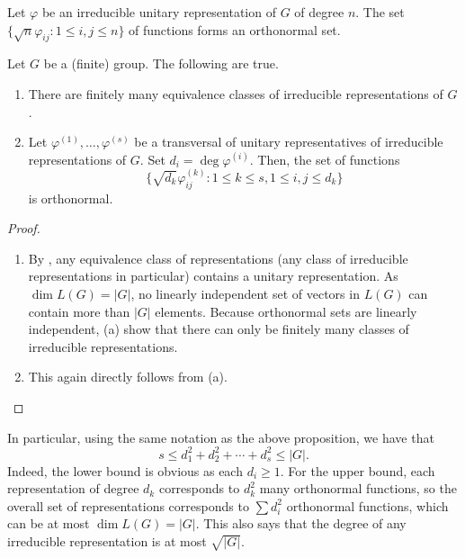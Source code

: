 		\begin{fcor}
			\label{cor: orthonormal set of fns for irred unitary rep}
			Let $\varphi$ be an irreducible unitary representation of $G$ of degree $n$. The set $\{ \sqrt{n} \varphi_{ij} : 1 \le i,j \le n \}$ of functions forms an orthonormal set.
		\end{fcor}

		\begin{fprop}
			\label{prop: finitely many irreducible representations}
			Let $G$ be a (finite) group. The following are true.
			\begin{enumerate}[label = (\alph*)]
				\item There are finitely many equivalence classes of irreducible representations of $G$.
				\item Let $\varphi^{(1)},\ldots,\varphi^{(s)}$ be a transversal of unitary representatives of irreducible representations of $G$. Set $d_i = \deg \varphi^{(i)}$. Then, the set of functions
				\[ \{ \sqrt{d_k} \varphi^{(k)}_{ij} : 1 \le k \le s, 1 \le i,j \le d_k \} \]
				is orthonormal.
			\end{enumerate}
		\end{fprop}
		\begin{proof}
			\phantom{pain}
			\begin{enumerate}[label = (\alph*)]
				\item By , any equivalence class of representations (any class of irreducible representations in particular) contains a unitary representation. As $\dim L(G) = |G|$, no linearly independent set of vectors in $L(G)$ can contain more than $|G|$ elements. Because orthonormal sets are linearly independent, (a) show that there can only be finitely many classes of irreducible representations.

				\item This again directly follows from (a).
			\end{enumerate}
		\end{proof}

		In particular, using the same notation as the above proposition, we have that
		\begin{equation}
			s \le d_1^2 + d_2^2 + \cdots + d_s^2 \le |G|. \label{eqn: sum of degree squared of irreds inequality}
		\end{equation}
		Indeed, the lower bound is obvious as each $d_i \ge 1$. For the upper bound, each representation of degree $d_k$ corresponds to $d_k^2$ many orthonormal functions, so the overall set of representations corresponds to $\sum d_i^2$ orthonormal functions, which can be at most $\dim L(G) = |G|$. This also says that the degree of any irreducible representation is at most $\sqrt{|G|}$.

